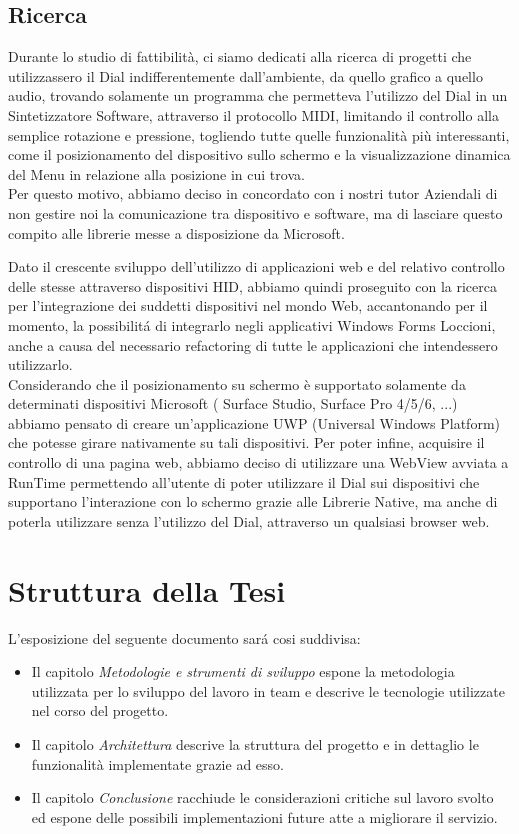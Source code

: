 \subsection{Ricerca}

Durante lo studio di fattibilità, ci siamo dedicati alla ricerca di progetti che utilizzassero il Dial indifferentemente dall’ambiente, da quello grafico a quello audio, trovando solamente un programma che permetteva l'utilizzo del Dial in un Sintetizzatore Software, attraverso il protocollo MIDI, limitando il controllo alla semplice rotazione e pressione, togliendo tutte quelle funzionalità più interessanti, come il posizionamento del dispositivo sullo schermo e la visualizzazione dinamica del Menu in relazione alla posizione in cui trova.\\

Per questo motivo, abbiamo deciso in concordato con i nostri tutor Aziendali di non gestire noi la comunicazione tra dispositivo e software, ma di lasciare questo compito alle librerie messe a disposizione da Microsoft.

Dato il crescente sviluppo dell'utilizzo di applicazioni web e del relativo controllo delle stesse attraverso dispositivi HID, abbiamo quindi proseguito con la ricerca per l'integrazione dei suddetti dispositivi nel mondo Web, accantonando per il momento, la possibilitá di integrarlo negli applicativi Windows Forms Loccioni, anche a causa del necessario refactoring di tutte le applicazioni che intendessero utilizzarlo.\\

Considerando che il posizionamento su schermo è supportato solamente da determinati dispositivi Microsoft ( Surface Studio, Surface Pro 4/5/6, ...) abbiamo pensato di creare un’applicazione UWP (Universal Windows Platform) che potesse girare nativamente su tali dispositivi. Per poter infine, acquisire il controllo di una pagina web, abbiamo deciso di utilizzare una WebView avviata a RunTime permettendo all'utente di poter utilizzare il Dial sui dispositivi che supportano l'interazione con lo schermo grazie alle Librerie Native, ma anche di poterla utilizzare senza l'utilizzo del Dial, attraverso un qualsiasi browser web.

\newpage
\section{Struttura della Tesi}
L'esposizione del seguente documento sará cosi suddivisa:
\begin{itemize}
\item Il capitolo \emph{Metodologie e strumenti di sviluppo} espone la metodologia utilizzata per lo sviluppo del lavoro in team e descrive le tecnologie utilizzate nel corso del progetto.
\item Il capitolo \emph{Architettura} descrive la struttura del progetto e in dettaglio le funzionalità implementate grazie ad esso.
\item Il capitolo \emph{Conclusione} racchiude le considerazioni critiche sul lavoro svolto ed espone delle possibili implementazioni future atte a migliorare il servizio.
\end{itemize}






